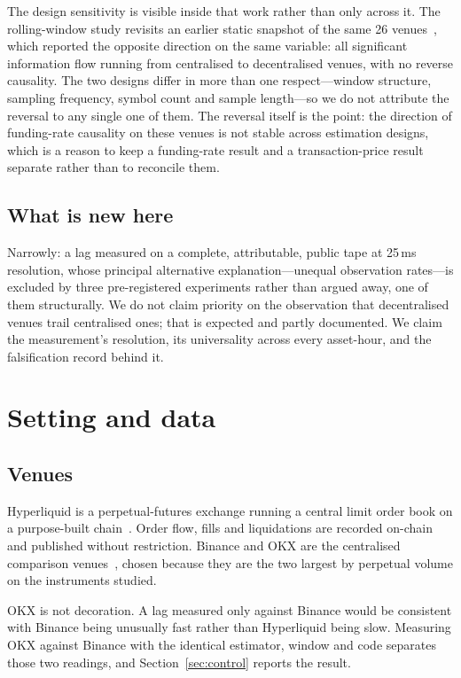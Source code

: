 \documentclass[11pt,a4paper]{article}
\begin{document}
The design sensitivity is visible inside that work rather than only across it. The rolling-window
study revisits an earlier static snapshot of the same 26 venues~\cite{zhivkov2026funding}, which
reported the opposite direction on the same variable: all significant information flow running from
centralised to decentralised venues, with no reverse causality. The two designs differ in more than
one respect---window structure, sampling frequency, symbol count and sample length---so we do not
attribute the reversal to any single one of them. The reversal itself is the point: the direction of
funding-rate causality on these venues is not stable across estimation designs, which is a reason to
keep a funding-rate result and a transaction-price result separate rather than to reconcile them.

\subsection{What is new here}

Narrowly: a lag measured on a complete, attributable, public tape at 25\,ms resolution, whose
principal alternative explanation---unequal observation rates---is excluded by three
pre-registered experiments rather than argued away, one of them structurally. We do not claim
priority on the observation that decentralised venues trail centralised ones; that is expected and
partly documented. We claim the measurement's resolution, its universality across every
asset-hour, and the falsification record behind it.

\section{Setting and data}

\subsection{Venues}

Hyperliquid is a perpetual-futures exchange running a central limit order book on a purpose-built
chain~\cite{hyperliquid}. Order flow, fills and liquidations are recorded on-chain and published
without restriction. Binance and OKX are the centralised comparison venues~\cite{binance,okx},
chosen because they are the two largest by perpetual volume on the instruments studied.

OKX is not decoration. A lag measured only against Binance would be consistent with Binance being
unusually fast rather than Hyperliquid being slow. Measuring OKX against Binance with the identical
estimator, window and code separates those two readings, and Section~\ref{sec:control} reports the
result.
\end{document}
